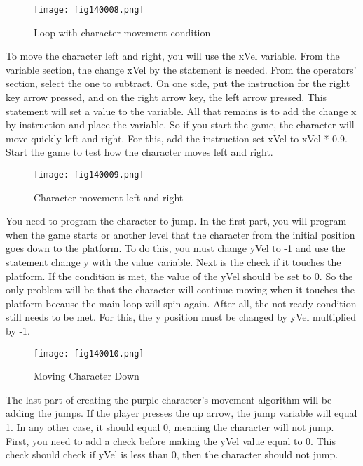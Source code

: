 \begin{figure}[H]
   \centering
   \texttt{[image: fig140008.png]}
   \caption{Loop with character movement condition}
\label{fig140008}
\end{figure}

To move the character left and right, you will use the xVel variable. From the variable section, the change xVel by the statement is needed. From the operators' section, select the one to subtract. On one side, put the instruction for the right key arrow pressed, and on the right arrow key, the left arrow pressed. This statement will set a value to the variable. All that remains is to add the change x by instruction and place the variable. So if you start the game, the character will move quickly left and right. For this, add the instruction set xVel to xVel * 0.9. Start the game to test how the character moves left and right.

\begin{figure}[H]
   \centering
   \texttt{[image: fig140009.png]}
   \caption{Character movement left and right}
\label{fig140009}
\end{figure}

You need to program the character to jump. In the first part, you will program when the game starts or another level that the character from the initial position goes down to the platform. To do this, you must change yVel to -1 and use the statement change y with the value variable. Next is the check if it touches the platform. If the condition is met, the value of the yVel should be set to 0. So the only problem will be that the character will continue moving when it touches the platform because the main loop will spin again. After all, the not-ready condition still needs to be met. For this, the y position must be changed by yVel multiplied by -1.

\begin{figure}[H]
   \centering
   \texttt{[image: fig140010.png]}
   \caption{Moving Character Down}
\label{fig140010}
\end{figure}

The last part of creating the purple character's movement algorithm will be adding the jumps. If the player presses the up arrow, the jump variable will equal 1. In any other case, it should equal 0, meaning the character will not jump. First, you need to add a check before making the yVel value equal to 0. This check should check if yVel is less than 0, then the character should not jump.

